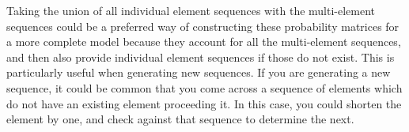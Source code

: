 Taking the union of all individual element sequences with the multi-element sequences could be a preferred way of constructing these probability matrices for a more complete model because they account for all the multi-element sequences, and then also provide individual element sequences if those do not exist. This is particularly useful when generating new sequences. If you are generating a new sequence, it could be common that you come across a sequence of elements which do not have an existing element proceeding it. In this case, you could shorten the element by one, and check against that sequence to determine the next.


